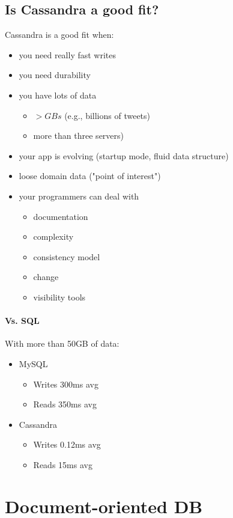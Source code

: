 \documentclass[10pt,a4paper]{article}
\begin{document}
 \subsection{Is Cassandra a good fit?}
 Cassandra is a good fit when:
 \begin{itemize}
 	\item you need really fast writes
 	\item you need durability
 	\item you have lots of data
	\begin{itemize}
		\item $> GBs$ (e.g., billions of tweets)
		\item more than three servers)
	\end{itemize} 	
	\item your app is evolving (startup mode, fluid data structure)
	\item loose domain data ("point of interest")
	\item your programmers can deal with
	\begin{itemize}
		\item documentation
		\item complexity
		\item consistency model
		\item change
		\item visibility tools
	\end{itemize}
 \end{itemize}
 \paragraph{Vs. SQL}
  With more than 50GB of data:
 \begin{itemize}
 	\item MySQL
 	\begin{itemize}
 		\item Writes 300ms avg
 		\item Reads 350ms avg
 	\end{itemize}
 	\item Cassandra
 	\begin{itemize}
 		\item Writes 0.12ms avg
 		\item Reads 15ms avg
 	\end{itemize}
 \end{itemize}
 \pagebreak
 \section{Document-oriented DB}
\end{document}
